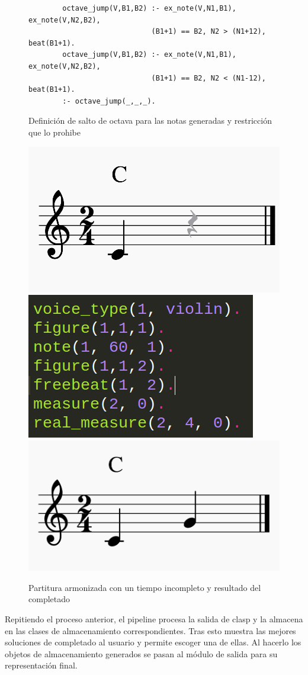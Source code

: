 \begin{figure}
	\centering
	\begin{verbatim}
		octave_jump(V,B1,B2) :- ex_note(V,N1,B1), ex_note(V,N2,B2),
		                     (B1+1) == B2, N2 > (N1+12), beat(B1+1).
		octave_jump(V,B1,B2) :- ex_note(V,N1,B1), ex_note(V,N2,B2),
		                     (B1+1) == B2, N2 < (N1-12), beat(B1+1).
		:- octave_jump(_,_,_).
	\end{verbatim}
	\label{fig:octave-jump}
	\caption{Definición de salto de octava para las notas generadas y restricción que lo prohibe}
\end{figure}

\begin{figure}[h]
	\centering
	\includegraphics[width=0.4\linewidth]{imagenes/incomplete_score.png}
	\includegraphics[width=0.4\linewidth]{imagenes/incomplete_facts.png}
	\includegraphics[width=0.6\linewidth]{imagenes/completed_score.png}
	\caption{Partitura armonizada con un tiempo incompleto y resultado del completado}
	\label{fig:simple-piece-complete}
\end{figure}

Repitiendo el proceso anterior, el pipeline procesa la salida de clasp y la almacena en las clases de almacenamiento correspondientes. Tras esto muestra las mejores soluciones de completado al usuario y permite escoger una de ellas. Al hacerlo los objetos de almacenamiento generados se pasan al módulo de salida para su representación final.

